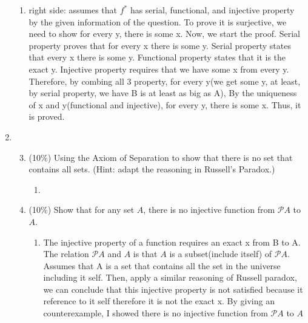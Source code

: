 \documentclass[10pt]{article}
\begin{document}
\begin{enumerate}
\begin{enumerate}
    \item right side: assumes that $f^{*}$ has serial, functional, and injective property by the given information of the question. To prove it is surjective, we need to show for every y, there is some x. Now, we start the proof. Serial property proves that for every x there is some y. Serial property states that every x there is some y. Functional property states that it is the exact y. Injective property requires that we have some x from every y. Therefore, by combing all 3 property, for every y(we get some y, at least, by serial property, we have B is at least as big as A), By the uniqueness of x and y(functional and injective), for every y, there is some x. Thus, it is proved.
  \end{enumerate}
  \item 
\begin{enumerate}
  \setcounter{enumi}{2}
  \item (10\%) Using the Axiom of Separation to show that there is no set that contains all sets. (Hint: adapt the reasoning in Russell's Paradox.)
  \begin{enumerate}
    \item 
  \end{enumerate}

  \item (10\%) Show that for any set $A$, there is no injective function from $\mathscr{P} A$ to $A$.
  \begin{enumerate}
    \item The injective property of a function requires an exact x from B to A. The relation $\mathscr{P} A$ and $A$ is that $A$ is a subset(include itself) of $\mathscr{P} A$. Assumes that A is a set that contains all the set in the universe including it self. Then, apply a similar reasoning of Russell paradox, we can conclude that this injective property is not satisfied because it reference to it self therefore it is not the exact x. By giving an counterexample, I showed there is no injective function from $\mathscr{P} A$ to $A$
  \end{enumerate}


\end{enumerate}
\end{enumerate}
\end{document}
